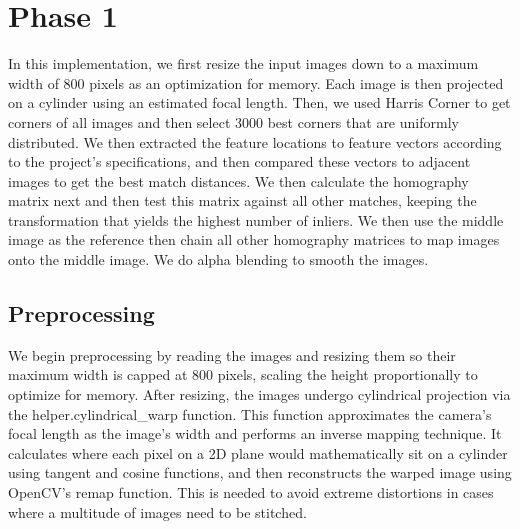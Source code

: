\documentclass[conference]{IEEEtran}
\begin{document}
\begin{abstract}
This report goes over the various panorama stitching techniques 
discussed in the course project. We go over the methodology, 
ideas, and implementation of stitching techniques. In phase 1,
we use a traditional feature-matching approach to stitching. In
Phase 2, we implement supervised and unsupervised deep learning
 approaches to estimate the homography between two images and
 blend them.
\end{abstract}





%
\IEEEpeerreviewmaketitle



\section{Phase 1}

In this implementation, we first resize the input images down to a maximum width of 
800 pixels as an optimization for memory. Each image is then projected on a cylinder
using an estimated focal length. Then, we used Harris Corner to get corners of all
images and then select 3000 best corners that are uniformly distributed. We then 
extracted the feature locations to feature vectors according to the project's 
specifications, and then compared these vectors to adjacent images to get the best
match distances. We then calculate the homography matrix next and then test this 
matrix against all other matches, keeping the transformation that yields the 
highest number of inliers. We then use the middle image as the reference then chain
all other homography matrices to map images onto the middle image. We do alpha blending
to smooth the images.

\subsection{Preprocessing}
We begin preprocessing by reading the images and resizing them 
so their maximum width is capped at 800 pixels, scaling the height proportionally 
to optimize for memory. After resizing, the images undergo cylindrical 
projection via the helper.cylindrical\_warp function. This function approximates 
the camera's focal length as the image's width and performs an inverse mapping 
technique. It calculates where each pixel on a 2D plane would mathematically 
sit on a cylinder using tangent and cosine functions, and then reconstructs 
the warped image using OpenCV's remap function. This is needed to avoid extreme
distortions in cases where a multitude of images need to be stitched.
\end{document}
